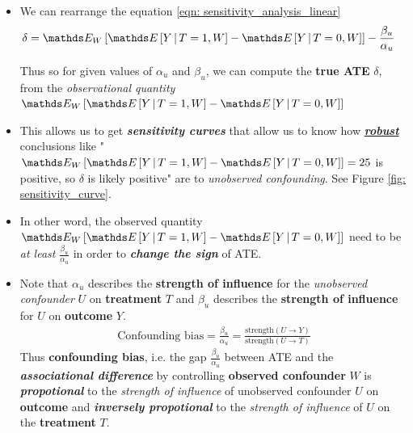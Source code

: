 \documentclass[11pt]{article}
\begin{document}
\begin{itemize}
\item  We can rearrange the equation \eqref{eqn: sensitivity_analysis_linear} 
 \begin{align*}
 \delta &=  \E{W}{\E{}{Y \,|\, T=1, W} - \E{}{Y \,|\, T=0, W}} -  \frac{\beta_u}{\alpha_u} 
 \end{align*}

Thus so for given values of $\alpha_u$ and $\beta_u$, we can compute the \textbf{true ATE} $\delta$, from the \emph{observational quantity} $\E{W}{\E{}{Y \,|\, T=1, W} - \E{}{Y \,|\, T=0, W}}$

\item This allows us to get \textbf{\emph{sensitivity curves}} that allow us to know how \underline{\textbf{\emph{robust}}} conclusions like "$\E{W}{\E{}{Y \,|\, T=1, W} - \E{}{Y \,|\, T=0, W}} = 25$ is positive, so $\delta$ is likely positive"  are to \emph{unobserved confounding}. See Figure \ref{fig: sensitivity_curve}.

\item In other word, the observed quantity $\E{W}{\E{}{Y \,|\, T=1, W} - \E{}{Y \,|\, T=0, W}}$ need to be \emph{at least}  $\frac{\beta_u}{\alpha_u}$ in order to \emph{\textbf{change the sign}} of ATE. 

\item Note that $\alpha_u$ describes the \textbf{strength of influence} for the \emph{unobserved confounder} $U$ on \textbf{treatment} $T$ and $\beta_u$ describes the \textbf{strength of influence} for $U$ on \textbf{outcome} $Y$. 
\begin{align*}
\text{Confounding bias} =  \frac{\beta_u}{\alpha_u} = \frac{\text{strength}(U \rightarrow Y)}{\text{strength}(U \rightarrow T)}
\end{align*}
Thus \textbf{confounding bias}, i.e. the gap $\frac{\beta_u}{\alpha_u}$ between ATE and the \emph{\textbf{associational difference}} by controlling \textbf{observed confounder} $W$ is \textbf{\emph{propotional}} to  the \emph{strength of influence} of unobserved confounder $U$ on \textbf{outcome} and \textbf{\emph{inversely propotional}} to the  \emph{strength of influence} of  $U$ on the \textbf{treatment} $T$.
\end{itemize}
\newpage


\end{document}
